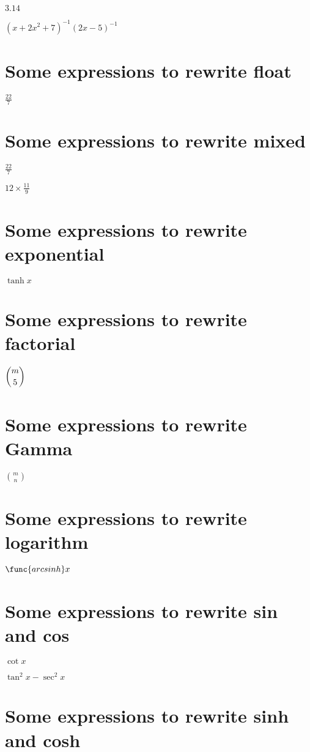 \documentclass{article}
\begin{document}
$3.14$

$\left( x+2x^{2}+7\right) ^{-1}\allowbreak \left( 2x-5\right) ^{-1}$

\section{Some expressions to rewrite float}

$\frac{22}{7}$

\section{Some expressions to rewrite mixed}

$\frac{22}{7}$

$12\times \frac{11}{9}$

\section{Some expressions to rewrite exponential}

$\tanh x$

\section{Some expressions to rewrite factorial}

$\dbinom{m}{5}$

\section{Some expressions to rewrite Gamma}

$\binom{m}{n}$

\section{Some expressions to rewrite logarithm}

$\func{arcsinh}x$

\section{Some expressions to rewrite sin and cos}

$\cot x$

$\tan ^{2}x-\sec ^{2}x$

\section{Some expressions to rewrite sinh and cosh}
\end{document}
